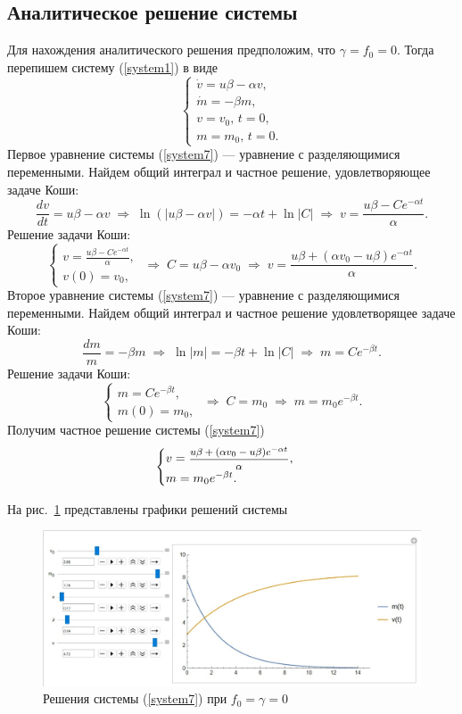 \documentclass[12pt, a4paper]{article}
\begin{document}
	\subsection{Аналитическое решение системы}
	Для нахождения аналитического решения предположим, что $\gamma=f_0=0$. Тогда перепишем систему (\ref{system1}) в виде
	\begin{equation}
		\begin{cases}
			\dot v=u\beta-\alpha v, \\
			\dot m=-\beta m, \\
			v=v_0,\,t=0,\\
			m=m_0,\,t=0.
		\end{cases}
		\label{system7}
	\end{equation}
	Первое уравнение системы (\ref{system7}) --- уравнение с разделяющимися переменными. Найдем общий интеграл и частное решение, удовлетворяющее задаче Коши: 
	\[
	\frac{dv}{dt}=u\beta-\alpha v
	\;\Rightarrow\;
	\ln(|u\beta-\alpha v|)=-\alpha t+\ln|C|
	\;\Rightarrow\;
	v=\frac{u\beta-Ce^{-\alpha t}}{\alpha}.
	\]
	Решение задачи Коши:
	\[
	\begin{cases}
		v=\frac{u\beta-Ce^{-\alpha t}}{\alpha},\\
		v(0)=v_0,
	\end{cases}
	\;\Rightarrow\;
	C=u\beta-\alpha v_0
	\;\Rightarrow\;
	v=\frac{u\beta+(\alpha v_0-u\beta)e^{-\alpha t}}{\alpha}.
	\]
	Второе уравнение системы (\ref{system7}) --- уравнение с разделяющимися переменными. Найдем общий интеграл и частное решение удовлетворящее задаче Коши:
	\[
	\frac{dm}{m}=-\beta m
	\;\Rightarrow\;
	\ln|m|=-\beta t+\ln|C|
	\;\Rightarrow\;
	m=Ce^{-\beta t}.
	\]
	Решение задачи Коши:
	\[
	\begin{cases}
		m=Ce^{-\beta t},\\
		m(0)=m_0,
	\end{cases}
	\;\Rightarrow\;
	C=m_0
	\;\Rightarrow\;
	m=m_0e^{-\beta t}.
	\]
	Получим частное решение системы (\ref{system7})
	\[
	\begin{cases}
		v=\hbox{\footnotesize$\displaystyle\frac{u\beta+(\alpha v_0-u\beta)e^{-\alpha t}}{\alpha}$},\\
		m=m_0e^{-\beta t}.
	\end{cases}
	\]
	
	На рис.~\ref{graphic} представлены графики решений системы
	\begin{figure}[H]
		\centering
		\includegraphics[width=\textwidth]{graphic}
		\caption{Решения системы (\ref{system7}) при $f_0=\gamma=0$}
		\label{graphic}
	\end{figure}	
	
\end{document}
